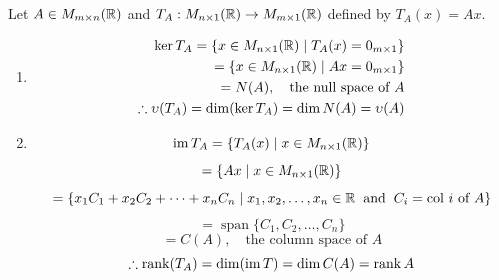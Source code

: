 \begin{example}
Let $A \in M_{m \times n}(\mathbb{R})$ and $T_A: M_{n \times 1}(\mathbb{R}) \to M_{m \times 1}(\mathbb{R})$ defined by $T_A(x) = Ax$.
\begin{enumerate}[label=(\alph*)]
    \item 
    \begin{align*}
    \ker T_A = \{x \in M_{n \times 1}(\mathbb{R}) \mid T_A(x) = 0_{m \times 1}\} \\
    =\{x \in M_{n \times 1}(\mathbb{R}) \mid Ax = 0_{m \times 1}\} \\
    =N(A), \quad \text{the null space of $A$} \\
    \therefore \upsilon(T_A) = \dim(\ker T_A) = \dim N(A) = \upsilon(A)
    \end{align*}
    
    
    \item 
    $$\operatorname{im} T_A = \{T_A(x) \mid x \in M_{n \times 1}(\mathbb{R})\}$$
    $$=\{Ax \mid x \in M_{n \times 1}(\mathbb{R})\}$$
    $$=\{x_1C_1 + x_2C_2 + \cdots + x_nC_n \mid x_1, x_2, \dots, x_n \in \mathbb{R} \hspace{0.2cm} \text{and} \hspace{0.2cm} C_i = \text{col $i$ of $A$}\}$$
    $$=\operatorname{span}\{C_1, C_2, \dots, C_n\}$$
    $$= C(A), \quad \text{the column space of $A$}$$
    $$\therefore \rank(T_A) = \dim(\operatorname{im} T) = \dim C(A) = \rank A$$
\end{enumerate}
\end{example}

